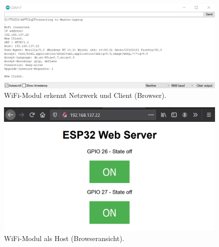 \begin{figure}[H]
	\centering
	\includegraphics[width=\textwidth]{graphics/ESP32_Serial_Monitor}
	\caption{WiFi-Modul erkennt Netzwerk und Client (Browser).}
	\label{fig:ESP32_Serial_Monitor}
\end{figure}

\begin{figure}[H]
	\centering
	\includegraphics[width=\textwidth]{graphics/ESP32_Webserver}
	\caption{WiFi-Modul als Host (Browseransicht).}
	\label{fig:ESP32_Webserver}
\end{figure}
